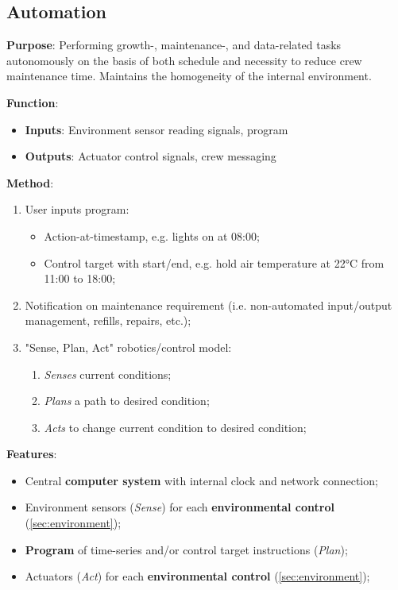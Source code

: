 \documentclass{report}
\begin{document}
\newpage

\subsection{Automation}
\label{sec:automation}

\textbf{Purpose}: Performing growth-, maintenance-, and data-related tasks autonomously on the basis of both schedule and necessity to reduce crew maintenance time. Maintains the homogeneity of the internal environment.

\textbf{Function}:
\begin{itemize}
    \item \textbf{Inputs}: Environment sensor reading signals, program
    \item \textbf{Outputs}: Actuator control signals, crew messaging
\end{itemize}

\textbf{Method}:
\begin{enumerate}
    \item User inputs program:
    \begin{itemize}
        \item Action-at-timestamp, e.g. lights on at 08:00;
        \item Control target with start/end, e.g. hold air temperature at 22°C from 11:00 to 18:00;
    \end{itemize}
    \item Notification on maintenance requirement (i.e. non-automated input/output management, refills, repairs, etc.);
    \item "Sense, Plan, Act" robotics/control model:
    \begin{enumerate}
        \item \textit{Senses} current conditions;
        \item \textit{Plans} a path to desired condition;
        \item \textit{Acts} to change current condition to desired condition;
    \end{enumerate}
\end{enumerate}

\textbf{Features}:
\begin{itemize}
    \item Central \textbf{computer system} with internal clock and network connection;
    \item Environment sensors (\textit{Sense}) for each \textbf{environmental control} (\ref{sec:environment});
    \item \textbf{Program} of time-series and/or control target instructions (\textit{Plan});
    \item Actuators (\textit{Act}) for each \textbf{environmental control} (\ref{sec:environment});
\end{itemize}
\end{document}
